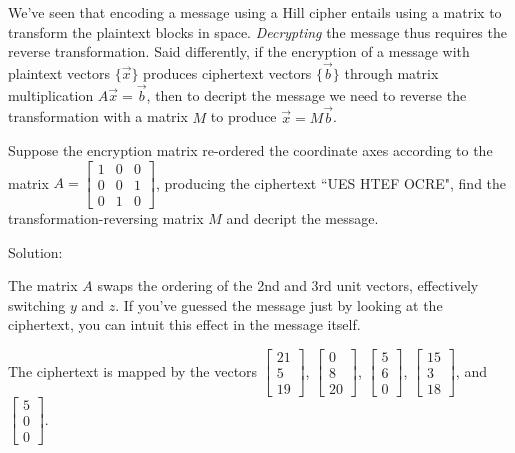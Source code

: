 \documentclass{ximera}
\begin{document}
We've seen that encoding a message using a Hill cipher entails using a matrix to transform the plaintext blocks in space. \emph{Decrypting} the message thus requires the reverse transformation. Said differently, if the encryption of a message with plaintext vectors $\lbrace \vec{x}\rbrace$ produces ciphertext vectors $\lbrace \vec{b}\rbrace$ through matrix multiplication $A\vec{x}=\vec{b}$, then to decript the message we need to reverse the transformation with a matrix $M$ to produce $\vec{x}=M\vec{b}$.

\begin{center}
\end{center}

\begin{example}
  Suppose the encryption matrix re-ordered the coordinate axes according to the matrix $A=\begin{bmatrix}
    1&0&0\\0&0&1\\0&1&0
  \end{bmatrix}$, producing the ciphertext ``UES HTEF OCRE", find the transformation-reversing matrix $M$ and decript the message.


Solution:

  The matrix $A$ swaps the ordering of the 2nd and 3rd unit vectors, effectively switching $y$ and $z$. If you've guessed the message just by looking at the ciphertext, you can intuit this effect in the message itself.

  The ciphertext is mapped by the vectors $\begin{bmatrix}
    21 \\5\\19\end{bmatrix}$, $\begin{bmatrix}
    0 \\8\\20 \end{bmatrix}$, $\begin{bmatrix}
    5\\6\\0\end{bmatrix}$, $\begin{bmatrix}
    15\\3\\18\end{bmatrix}$, and $\begin{bmatrix}
    5\\0\\0\end{bmatrix}$.


\end{example}
\end{document}
